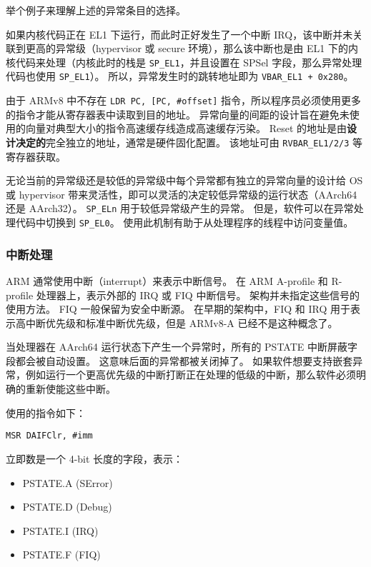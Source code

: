 举个例子来理解上述的异常条目的选择。

如果内核代码正在 EL1 下运行，而此时正好发生了一个中断 IRQ，该中断并未关联到更高的异常级（hypervisor 或 secure 环境），那么该中断也是由 EL1 下的内核代码来处理（内核此时的栈是 \lstinline!SP_EL1!，并且设置在 SPSel 字段，那么异常处理代码也使用 \lstinline!SP_EL1!）。
所以，异常发生时的跳转地址即为 \lstinline!VBAR_EL1 + 0x280!。

由于 ARMv8 中不存在 \lstinline!LDR PC, [PC, #offset]! 指令，所以程序员必须使用更多的指令才能从寄存器表中读取到目的地址。
异常向量的间距的设计旨在避免未使用的向量对典型大小的指令高速缓存线造成高速缓存污染。
Reset 的地址是由\textbf{设计决定的}完全独立的地址，通常是硬件固化配置。
该地址可由 \lstinline!RVBAR_EL1/2/3! 等寄存器获取。

无论当前的异常级还是较低的异常级中每个异常都有独立的异常向量的设计给 OS 或 hypervisor 带来灵活性，即可以灵活的决定较低异常级的运行状态（AArch64 还是 AArch32）。
\lstinline!SP_ELn! 用于较低异常级产生的异常。
但是，软件可以在异常处理代码中切换到 \lstinline!SP_EL0!。
使用此机制有助于从处理程序的线程中访问变量值。

\subsubsection{中断处理}

ARM 通常使用中断（interrupt）来表示中断信号。
在 ARM A-profile 和 R-profile 处理器上，表示外部的 IRQ 或 FIQ 中断信号。
架构并未指定这些信号的使用方法。
FIQ 一般保留为安全中断源。
在早期的架构中，FIQ 和 IRQ 用于表示高中断优先级和标准中断优先级，但是 ARMv8-A 已经不是这种概念了。

当处理器在 AArch64 运行状态下产生一个异常时，所有的 PSTATE 中断屏蔽字段都会被自动设置。
这意味后面的异常都被关闭掉了。
如果软件想要支持嵌套异常，例如运行一个更高优先级的中断打断正在处理的低级的中断，那么软件必须明确的重新使能这些中断。

使用的指令如下：

{
  \lstinline!MSR DAIFClr, #imm!
}

立即数是一个 4-bit 长度的字段，表示：

\begin{itemize}
  \item PSTATE.A (SError)
  \item PSTATE.D (Debug)
  \item PSTATE.I (IRQ)
  \item PSTATE.F (FIQ)
\end{itemize}


